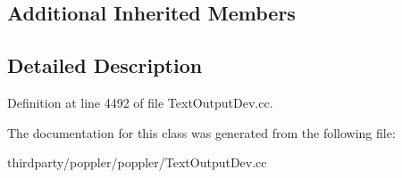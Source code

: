 \subsection*{Additional Inherited Members}


\subsection{Detailed Description}


Definition at line 4492 of file Text\+Output\+Dev.\+cc.



The documentation for this class was generated from the following file\+:\begin{DoxyCompactItemize}
\item 
thirdparty/poppler/poppler/Text\+Output\+Dev.\+cc\end{DoxyCompactItemize}
